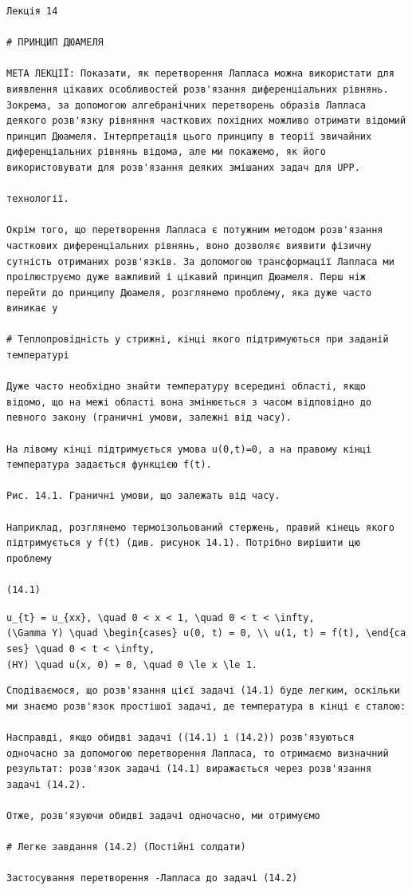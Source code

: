 \documentclass[
  ukrainian,
]{article}
\begin{document}
\begin{verbatim}
Лекція 14

# ПРИНЦИП ДЮАМЕЛЯ

МЕТА ЛЕКЦІЇ: Показати, як перетворення Лапласа можна використати для виявлення цікавих особливостей розв'язання диференціальних рівнянь. Зокрема, за допомогою алгебранічних перетворень образів Лапласа деякого розв'язку рівняння часткових похідних можливо отримати відомий принцип Дюамеля. Інтерпретація цього принципу в теорії звичайних диференціальних рівнянь відома, але ми покажемо, як його використовувати для розв'язання деяких змішаних задач для UPP.

технології.

Окрім того, що перетворення Лапласа є потужним методом розв'язання часткових диференціальних рівнянь, воно дозволяє виявити фізичну сутність отриманих розв'язків. За допомогою трансформації Лапласа ми проілюструємо дуже важливий і цікавий принцип Дюамеля. Перш ніж перейти до принципу Дюамеля, розглянемо проблему, яка дуже часто виникає у

# Теплопровідність у стрижні, кінці якого підтримуються при заданій температурі

Дуже часто необхідно знайти температуру всередині області, якщо відомо, що на межі області вона змінюється з часом відповідно до певного закону (граничні умови, залежні від часу).

На лівому кінці підтримується умова u(0,t)=0, а на правому кінці температура задається функцією f(t).

Рис. 14.1. Граничні умови, що залежать від часу.

Наприклад, розглянемо термоізольований стержень, правий кінець якого підтримується у f(t) (див. рисунок 14.1). Потрібно вирішити цю проблему

(14.1)
\end{verbatim}

\texttt{u\_\{t\}\ =\ u\_\{xx\},\ \textbackslash{}quad\ 0\ \textless{}\ x\ \textless{}\ 1,\ \textbackslash{}quad\ 0\ \textless{}\ t\ \textless{}\ \textbackslash{}infty,}
\texttt{(\textbackslash{}Gamma\ Y)\ \textbackslash{}quad\ \textbackslash{}begin\{cases\}\ u(0,\ t)\ =\ 0,\ \textbackslash{}\textbackslash{}\ u(1,\ t)\ =\ f(t),\ \textbackslash{}end\{cases\}\ \textbackslash{}quad\ 0\ \textless{}\ t\ \textless{}\ \textbackslash{}infty,}
\texttt{(HY)\ \textbackslash{}quad\ u(x,\ 0)\ =\ 0,\ \textbackslash{}quad\ 0\ \textbackslash{}le\ x\ \textbackslash{}le\ 1.}

\begin{verbatim}
Сподіваємося, що розв'язання цієї задачі (14.1) буде легким, оскільки ми знаємо розв'язок простішої задачі, де температура в кінці є сталою:

Насправді, якщо обидві задачі ((14.1) і (14.2)) розв'язуються одночасно за допомогою перетворення Лапласа, то отримаємо визначний результат: розв'язок задачі (14.1) виражається через розв'язання задачі (14.2).

Отже, розв'язуючи обидві задачі одночасно, ми отримуємо

# Легке завдання (14.2) (Постійні солдати)

Застосування перетворення -Лапласа до задачі (14.2)
\end{verbatim}
\end{document}
